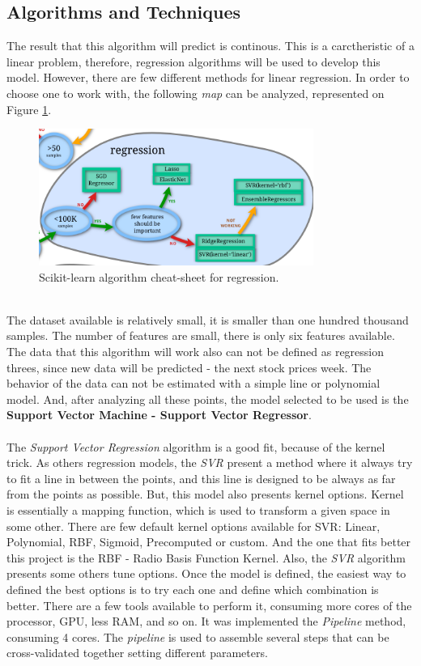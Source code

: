 \subsection{Algorithms and Techniques}
\label{subsec:algorithm}
The result that this algorithm will predict is continous. This is a carctheristic of a linear problem, therefore, regression algorithms will be used to develop this model.
However, there are few different methods for linear regression. In order to choose one to work with, the following \textit{map} can be analyzed, represented on Figure \ref{fig:regression_map}.\\
\begin{figure}[H]
\centering
\includegraphics[width=0.8\textwidth]{figures/regression_map.png}
\caption{\label{fig:data} Scikit-learn algorithm cheat-sheet for regression.}
\label{fig:regression_map}
\end{figure}
\ \\
The dataset available is relatively small, it is smaller than one hundred thousand samples. The number of features are small, there is only six features available. The data that this 
algorithm will work also can not be defined as regression threes, since new data will be predicted - the next stock prices week.
The behavior of the data can not be estimated with a simple line or polynomial model. And, after analyzing all these points, the model selected to be used is the \textbf{Support Vector Machine - 
Support Vector Regressor}.\\
\\

The \textit{Support Vector Regression} algorithm is a good fit, because of the kernel trick. As others regression models, the \textit{SVR} present a method where it always try to fit a line
in between the points, and this line is designed to be always as far from the points as possible. But, this model also presents kernel options. Kernel is essentially a mapping function, which is
used to transform a given space in some other. There are few default kernel options available for SVR: Linear, Polynomial, RBF, Sigmoid, Precomputed or custom. And the one that fits better
this project is the RBF - Radio Basis Function Kernel. Also, the \textit{SVR} algorithm presents some others tune options. Once the model is defined, the easiest way to defined the best options
is to try each one and define which combination is better. There are a few tools available to perform it, consuming more cores of the processor, GPU, less RAM, and so on. It was implemented
the \textit{Pipeline} method, consuming 4 cores. The \textit{pipeline} is used to assemble several steps that can be cross-validated together setting different parameters.



